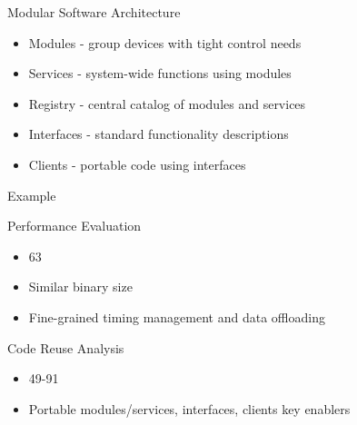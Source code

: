 \documentclass[18 pt]{beamer}
\begin{document}
\begin{frame}{Modular Software Architecture}
\begin{itemize}
\item Modules - group devices with tight control needs
\item Services - system-wide functions using modules
\item Registry - central catalog of modules and services
\item Interfaces - standard functionality descriptions
\item Clients - portable code using interfaces
\end{itemize}
\end{frame}
\begin{frame}{Example}
  \begin{figure}
  \end{figure}
\end{frame}
\begin{frame}{Performance Evaluation}
\begin{itemize}
\item 63%
\item Similar binary size
\item Fine-grained timing management and data offloading
\end{itemize}
\end{frame}

\begin{frame}{Code Reuse Analysis}
\begin{itemize}
\item 49-91%
\item Portable modules/services, interfaces, clients key enablers
\end{itemize}
\end{frame}
\end{document}
